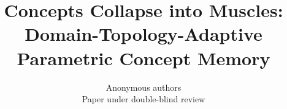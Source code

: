 %
%
%         

\documentclass[11pt,letterpaper]{article}

\usepackage[margin=1in]{geometry}



\title{%
  \textbf{Concepts Collapse into Muscles:} \\[2pt]
  \large Domain-Topology-Adaptive Parametric Concept Memory
}
\author{Anonymous authors \\ Paper under double-blind review}
\date{}  %



\maketitle

\begin{abstract}

\end{abstract}





%


